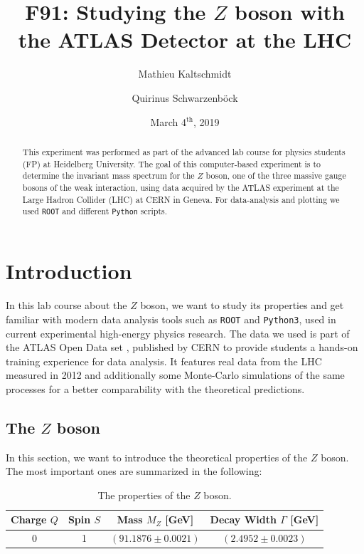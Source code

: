 \documentclass[twocolumn,
			   showpacs,%
               nofootinbib,
               aps,%
               prd,
               notitlepage,
               showkeys,
               10pt]{revtex4-1}
\begin{document}
{\hypersetup{allcolors=black}
\title{F91: Studying the $Z$ boson with the ATLAS Detector at the LHC }
\author{Mathieu Kaltschmidt}
\author{Quirinus Schwarzenb\"ock}

\date[Carried out in the week of  ]{March 4$^{\text{th}}$, 2019}


\begin{abstract}
This experiment was performed as part of the advanced lab course for physics students (FP) at Heidelberg University.
The goal of this computer-based experiment is to determine the invariant mass spectrum for the $Z$ boson, one of the three massive gauge bosons of the weak interaction, using data acquired by the ATLAS experiment at the Large Hadron Collider (LHC) at CERN in Geneva. For data-analysis  and plotting we used \verb|ROOT| and different \verb|Python| scripts.
\end{abstract}

\maketitle


}
\section{Introduction}
In this lab course about the $Z$ boson, we want to study its properties and get familiar with modern data analysis tools such as \verb|ROOT| and \verb|Python3|, used in current experimental high-energy physics research. The data we used is part of the ATLAS Open Data set \cite{DATA}, published by CERN to provide students a hands-on training experience for data analysis. It features real data from the LHC measured in 2012 and additionally some Monte-Carlo simulations of the same processes for a better comparability with the theoretical predictions.

\subsection{The $Z$ boson}
In this section, we want to introduce the theoretical properties of the $Z$ boson. The most important ones are summarized in the following:

\begin{table}[!htbp]
	\centering
	\renewcommand{\arraystretch}{1.5}
	\begin{tabular}{c|c|c|c}
	Charge $Q$ & Spin $S$ & Mass $M_Z$ [GeV] & Decay Width $\Gamma$ [GeV] \\ \hline 
	 0 & 1 & $(91.1876 \pm 0.0021)$ & $(2.4952 \pm 0.0023)$ \\
		\end{tabular}
	\caption{\label{tab:Z_props}The properties of the $Z$ boson.}
\end{table}
\end{document}
